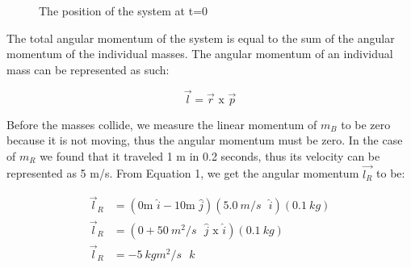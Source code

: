 \documentclass[12pt]{article}
\begin{document}
\begin{figure}[H]
    \centering

    \caption[10pt]{The position of the system at t=0}

\end{figure}
The total angular momentum of the system is equal to the sum of the angular momentum of the individual masses. The angular momentum of an individual mass can be represented as such:

\begin{equation} \label{eq1}
    \vec{l} = \vec{r} \text{ x } \vec{p}
\end{equation}


Before the masses collide, we measure the linear momentum of $m_B$ to be zero because it is not moving, thus the angular momentum must be zero. In the case of $m_R$ we found that it traveled 1 m in 0.2 seconds, thus its velocity can be represented as 5 m/s. From Equation 1, we get the angular momentum $\vec{l_R}$ to be:

\begin{equation*}
    \begin{split}
        \vec{l}_R & = (0 \text{m $\hat{i}$} - 10 \text{m $\hat{j}$})(\SI{5.0}{m/s} \text{ $\hat{i}$}) (\SI{0.1}{kg}) \\
        \vec{l}_R & = (0 + \SI{50}{m^2/s} \text{ $\hat{j}$ x $\hat{i}$}) (\SI{0.1}{kg}) \\
        \vec{l}_R & = \SI{-5}{kg m^2/s} \text{ $\hat{k}$}
    \end{split}
\end{equation*}
\end{document}
